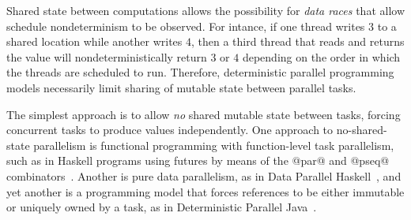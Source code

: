 \documentclass{article}
\begin{document}
Shared state between computations allows the possibility for
\emph{data races} that allow schedule nondeterminism to be observed.
For intance, if one thread writes $3$ to a shared location while
another writes $4$, then a third thread that reads and returns the
value will nondeterministically return $3$ or $4$ depending on the
order in which the threads are scheduled to run.  Therefore,
deterministic parallel programming models necessarily limit sharing of
mutable state between parallel tasks.

The simplest approach is to allow \emph{no} shared mutable state
between tasks, forcing concurrent tasks to produce values
independently.  One approach to no-shared-state parallelism is
functional programming with function-level task parallelism, such as
in Haskell programs using futures by means of the @par@ and @pseq@
combinators~\cite{marlow-par}.  Another is pure data parallelism, as
in Data Parallel Haskell~\cite{dph}, and yet another is a programming
model that forces references to be either immutable or uniquely owned
by a task, as in Deterministic Parallel Java~\cite{dpj-oopsla}.
\end{document}
